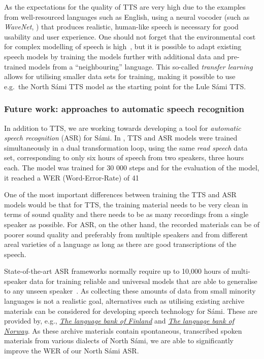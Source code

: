 \documentclass[free]{flammie}
\begin{document}
As the expectations for the quality of TTS are very high due to the examples
from well-resourced languages such as English, using a neural vocoder (such as
\textit{WaveNet}, \cite{oord2016wavenet}) that produces realistic, human-like
speech is necessary for good usability and user experience. One should not
forget that the environmental cost for complex modelling of speech is
high~\cite{makashova2021speech}, but it is possible to adapt existing speech
models by training the models further with additional data and pre-trained
models from a ``neighbouring'' language. This so-called \textit{transfer
learning}~\cite{tu2019end} allows for utilising smaller data sets for training,
making it possible to use e.g.\ the North Sámi TTS model as the starting point
for the Lule Sámi TTS.\@

\subsubsection{Future work: approaches to automatic speech recognition}



In addition to TTS, we are working towards developing a tool for
\textit{automatic speech recognition} (ASR) for Sámi. In
\cite{makashova2021speech}, TTS and ASR models were trained simultaneously in
a dual transformation loop, using the same \textit{read speech} data set,
corresponding to only six hours of speech from two speakers, three hours each.
The model was trained for 30 000 steps and for the evaluation of the model, it
reached a WER (Word-Error-Rate) of 41\

One of the most important differences between training the TTS and ASR models
would be that for TTS, the training material needs to be very clean in terms of
sound quality and there needs to be as many recordings from a single speaker as
possible. For ASR, on the other hand, the recorded materials can be of poorer
sound quality and preferably from multiple speakers and from different areal
varieties of a language as long as there are good transcriptions of the speech.

State-of-the-art ASR frameworks normally require up to 10,000 hours of
multi-speaker data for training reliable and universal models that are able to
generalise to any unseen speaker~\cite{hannun2014deep}. As collecting these
amounts of data from small minority languages is not a realistic goal,
alternatives such as utilising existing archive materials can be considered for
developing speech technology for Sámi. These are provided by, e.g.,
\textit{\href{https://www.kielipankki.fi/language-bank/}{The language bank of
Finland}} and
\textit{\href{https://www.nb.no/sprakbanken/en/resource-catalogue/oai-tekstlab-uio-no-lia-sapmi/}
{The language bank of Norway}}. As these archive materials contain spontaneous,
transcribed spoken materials from various dialects of North Sámi, we are able to
significantly improve the WER of our North Sámi ASR.\@
\end{document}
